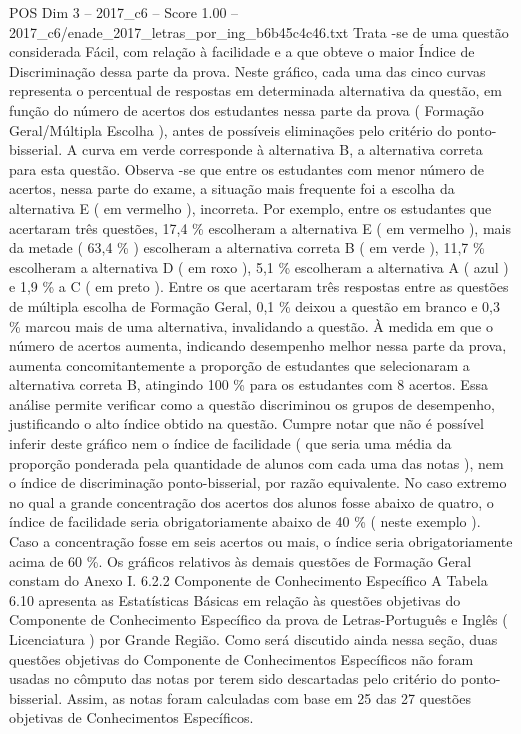 \begin{textsample}{POS Dim 3 – 2017\_c6 – Score 1.00 – 2017\_c6/enade\_2017\_letras\_por\_ing\_b6b45c4c46.txt}
Trata -se de uma questão considerada Fácil, com relação à facilidade e a que obteve o maior Índice de Discriminação dessa parte da prova.
Neste gráfico, cada uma das cinco curvas representa o percentual de respostas em determinada alternativa da questão, em função do número de acertos dos estudantes nessa parte da prova ( Formação Geral/Múltipla Escolha ), antes de possíveis eliminações pelo critério do ponto-bisserial.
A curva em verde corresponde à alternativa B, a alternativa correta para esta questão.
Observa -se que entre os estudantes com menor número de acertos, nessa parte do exame, a situação mais frequente foi a escolha da alternativa E ( em vermelho ), incorreta.
Por exemplo, entre os estudantes que acertaram três questões, 17,4 \% escolheram a alternativa E ( em vermelho ), mais da metade ( 63,4 \% ) escolheram a alternativa correta B ( em verde ), 11,7 \% escolheram a alternativa D ( em roxo ), 5,1 \% escolheram a alternativa A ( azul ) e 1,9 \% a C ( em preto ).
Entre os que acertaram três respostas entre as questões de múltipla escolha de Formação Geral, 0,1 \% deixou a questão em branco e 0,3 \% marcou mais de uma alternativa, invalidando a questão.
À medida em que o número de acertos aumenta, indicando desempenho melhor nessa parte da prova, aumenta concomitantemente a proporção de estudantes que selecionaram a alternativa correta B, atingindo 100 \% para os estudantes com 8 acertos.
Essa análise permite verificar como a questão discriminou os grupos de desempenho, justificando o alto índice obtido na questão.
Cumpre notar que não é possível inferir deste gráfico nem o índice de facilidade ( que seria uma média da proporção ponderada pela quantidade de alunos com cada uma das notas ), nem o índice de discriminação ponto-bisserial, por razão equivalente.
No caso extremo no qual a grande concentração dos acertos dos alunos fosse abaixo de quatro, o índice de facilidade seria obrigatoriamente abaixo de 40 \% ( neste exemplo ).
Caso a concentração fosse em seis acertos ou mais, o índice seria obrigatoriamente acima de 60 \%.
Os gráficos relativos às demais questões de Formação Geral constam do Anexo I. 6.2.2 Componente de Conhecimento Específico A Tabela 6.10 apresenta as Estatísticas Básicas em relação às questões objetivas do Componente de Conhecimento Específico da prova de Letras-Português e Inglês ( Licenciatura ) por Grande Região.
Como será discutido ainda nessa seção, duas questões objetivas do Componente de Conhecimentos Específicos não foram usadas no cômputo das notas por terem sido descartadas pelo critério do ponto-bisserial.
Assim, as notas foram calculadas com base em 25 das 27 questões objetivas de Conhecimentos Específicos.

\end{textsample}
